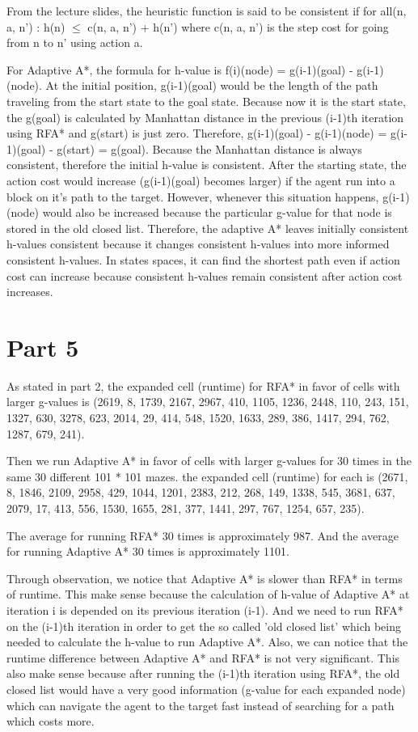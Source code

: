 \documentclass{article}
\begin{document}
From the lecture slides, the heuristic function is said to be consistent if
        for all(n, a, n’) : h(n) $\leq$ c(n, a, n’) + h(n’)
where c(n, a, n’) is the step cost for going from n to n’ using action a.

For Adaptive A*, the formula for h-value is f{\tiny (i)}(node) = g{\tiny (i-1)}(goal) - g{\tiny (i-1)}(node). At the initial position, g{\tiny (i-1)}(goal) would be the length of the path traveling from the start state to the goal state. Because now it is the start state, the g(goal) is calculated by Manhattan distance in the previous (i-1)th iteration using RFA* and g(start) is just zero. Therefore, g{\tiny (i-1)}(goal) - g{\tiny (i-1)}(node) = g{\tiny (i-1)}(goal) - g(start) = g(goal). Because the Manhattan distance is always consistent, therefore the initial h-value is consistent. After the starting state, the action cost would increase (g{\tiny (i-1)}(goal) becomes larger) if the agent run into a block on it's path to the target. However, whenever this situation happens, g{\tiny (i-1)}(node) would also be increased because the particular g-value for that node is stored in the old closed list. Therefore, the adaptive A* leaves initially consistent h-values consistent because it changes consistent h-values into more informed consistent h-values. In states spaces, it can find the shortest path even if action cost can increase because consistent h-values remain consistent after action cost increases.

\section*{Part 5}
\hspace{5mm}
As stated in part 2, the expanded cell (runtime) for RFA* in favor of cells with larger g-values is
(2619, 8, 1739, 2167, 2967, 410, 1105, 1236, 2448, 110, 243, 151, 1327, 630, 3278, 623, 2014, 29, 414, 548, 1520, 1633, 289, 386, 1417, 294, 762, 1287, 679, 241).

Then we run Adaptive A* in favor of cells with larger g-values for 30 times in the same 30 different 101 * 101 mazes. the expanded cell (runtime) for each is
(2671, 8, 1846, 2109, 2958, 429, 1044, 1201, 2383, 212, 268, 149, 1338, 545, 3681, 637, 2079, 17, 413, 556, 1530, 1655, 281, 377, 1441, 297, 767, 1254, 657, 235).

The average for running RFA* 30 times is approximately 987. And the average for running Adaptive A* 30 times is approximately 1101.

Through observation, we notice that Adaptive A* is slower than RFA* in terms of runtime. This make sense because the calculation of h-value of Adaptive A* at iteration i is depended on its previous iteration (i-1). And we need to run RFA* on the (i-1)th iteration in order to get the so called 'old closed list' which being needed to calculate the h-value to run Adaptive A*. Also, we can notice that the runtime difference between Adaptive A* and RFA* is not very significant. This also make sense because after running the (i-1)th iteration using RFA*, the old closed list would have a very good information (g-value for each expanded node) which can navigate the agent to the target fast instead of searching for a path which costs more.
\end{document}
